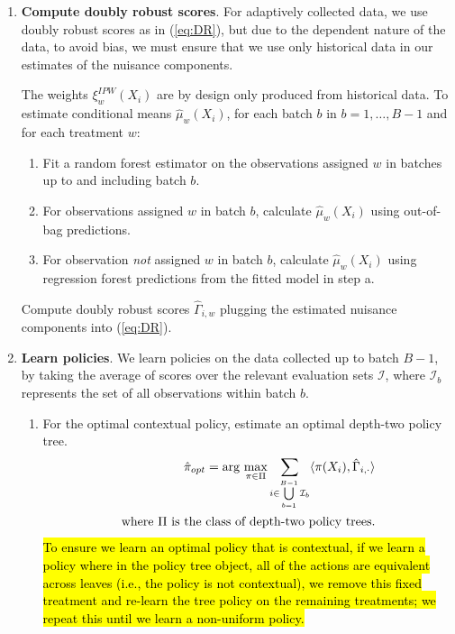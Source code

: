 \documentclass[letterpaper, 12pt, parskip=full,]{scrartcl}
\begin{document}
\begin{enumerate}
\item \textbf{Compute doubly robust scores}. For adaptively collected data, we use doubly robust scores as in (\ref{eq:DR}), but due to the dependent nature of the data, to avoid bias, we must ensure that we use only historical data in our estimates of the nuisance components. 

The weights $\xi^{IPW}_w(X_i)$ are by design only produced from historical data. To estimate conditional means $\hat \mu_w(X_i)$, for each batch $b$ in $b = 1, \dots, B-1$ and for each treatment $w$:
\begin{enumerate}
\item Fit a random forest estimator on the observations assigned $w$ in batches up to and including batch $b$. 
\item For observations assigned $w$ in batch $b$, calculate $\hat\mu_w(X_i)$ using out-of-bag predictions. 
\item For observation \textit{not} assigned $w$ in batch $b$, calculate $\hat\mu_w(X_i)$ using regression forest predictions from the fitted model in step a. 
\end{enumerate}

 Compute doubly robust scores $\hat{\Gamma}_{i,w}$ plugging the estimated nuisance components into (\ref{eq:DR}). 
\item \textbf{Learn policies}. We learn policies on the data collected up to batch $B-1$, by taking the average of scores over the relevant evaluation sets $\mathcal{I}$, where $\mathcal{I}_b$ represents the set of all observations within batch $b$.
\begin{enumerate}
\item For the optimal contextual policy, estimate an optimal depth-two policy tree. 
    \begin{align*}
      \hat{\pi}_{opt} = \arg\max_{\pi \in \Pi}
      \sum_{i \in \bigcup\limits_{b=1}^{B-1} \mathcal{I}_{b} }
      \langle \pi(X_{i}), \hat{\Gamma}_{i, \cdot} \rangle \\
       \text{where } \Pi \text{ is the class of depth-\textcolor{black}{two} policy trees.}
    \end{align*}
    \hl{To ensure we learn an optimal policy that is contextual, if we learn a policy where in the policy tree object, all of the actions are equivalent across leaves (i.e., the policy is not contextual), we remove this fixed treatment and re-learn the tree policy on the remaining treatments; we repeat this until we learn a non-uniform policy. }
    

\end{enumerate}
\end{enumerate}
\end{document}
